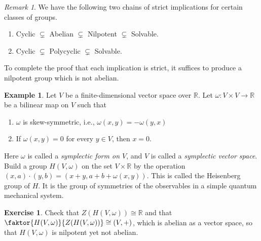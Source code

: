 \documentclass[10pt,letterpaper,cm]{nupset}
\theoremstyle{definition}
\newtheorem{exmp}[definition]{Example}
\theoremstyle{theorem}
\newtheorem{exercise}[definition]{Exercise}
\theoremstyle{remark}
\newtheorem{remark}[definition]{Remark}
\newcommand{\R}{\mathbb R}
\newcommand{\1}{\mathbf{1}}
\newcommand{\0}{\vec 0}
\begin{document}
\begin{remark}\label{r10}
 We have the following two chains of strict implications for certain classes of groups.
\begin{enumerate}
\item Cyclic $\subsetneq$ Abelian $\subsetneq$ Nilpotent $\subsetneq$ Solvable.
\item Cyclic $\subsetneq$ Polycyclic $\subsetneq$  Solvable.
\end{enumerate}
To complete the proof that each implication is strict, it suffices to produce a nilpotent group which is not abelian.

\end{remark}

\begin{exmp}
Let $V$ be a finite-dimensional vector space over $\R$. Let $\omega: V\times V\to \R$ be a bilinear map on $V$ such that
\begin{enumerate}[label=(\alph*)]
\item $\omega$ is skew-symmetric, i.e., $\omega(x,y) = -\omega(y,x)$
\item If $\omega(x,y) =0$ for every $y \in V$, then $x=0$.
\end{enumerate}
Here $\omega$ is called a \textit{symplectic form on $V$}, and $V$ is called a \textit{symplectic vector space}. Build a group $H(V, \omega)$ on the set $V \times \R$ by the operation $(x,a)\cdot(y,b) = (x+y, a+b + \omega(x,y))$. This is called the Heisenberg group of $H$. It is the group of symmetries of the observables in a simple quantum mechanical system. 

\begin{exercise} 
Check that $Z(H(V, \omega)) \cong \R$ and that $\faktor{H(V, \omega)}{Z(H(V, \omega))} \cong (V, +)$, which is abelian as a vector space, so that $H(V, \omega)$ is nilpotent yet not abelian. 
\end{exercise}
\end{exmp}
\end{document}
